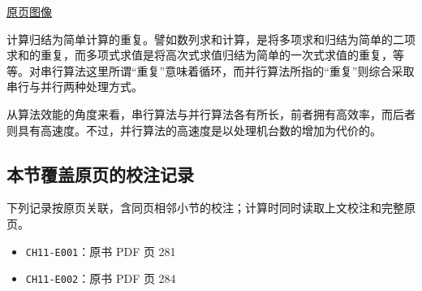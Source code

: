 \documentclass[
  10pt,
  fontset=fandol]{ctexart}
\providecommand{\tightlist}{%
  \setlength{\itemsep}{0pt}\setlength{\parskip}{0pt}}
\begin{document}
\href{../../source-images/pdf-285.jpeg}{原页图像}

计算归结为简单计算的重复。譬如数列求和计算，是将多项求和归结为简单的二项求和的重复，而多项式求值是将高次式求值归结为简单的一次式求值的重复，等等。对串行算法这里所谓``重复''意味着循环，而并行算法所指的``重复''则综合采取串行与并行两种处理方式。

从算法效能的角度来看，串行算法与并行算法各有所长，前者拥有高效率，而后者则具有高速度。不过，并行算法的高速度是以处理机台数的增加为代价的。

\subsection{本节覆盖原页的校注记录}\label{ux672cux8282ux8986ux76d6ux539fux9875ux7684ux6821ux6ce8ux8bb0ux5f55}

下列记录按原页关联，含同页相邻小节的校注；计算时同时读取上文校注和完整原页。

\begin{itemize}
\tightlist
\item
  \texttt{CH11-E001}：原书 PDF 页 281
\item
  \texttt{CH11-E002}：原书 PDF 页 284
\end{itemize}
\end{document}
